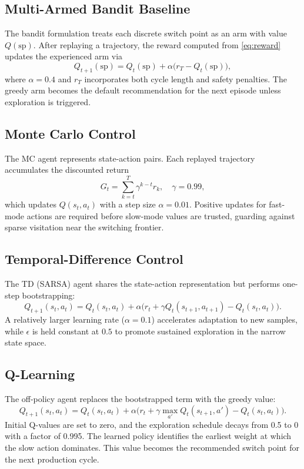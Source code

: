 \documentclass[journal]{IEEEtranTIE}
\begin{document}
\subsection{Multi-Armed Bandit Baseline}
The bandit formulation treats each discrete switch point as an arm with value $Q(\text{sp})$. After replaying a trajectory, the reward computed from \eqref{eq:reward} updates the experienced arm via
\begin{equation}
  Q_{t+1}(\text{sp}) = Q_t(\text{sp}) + \alpha \bigl( r_T - Q_t(\text{sp}) \bigr),
\end{equation}
where $\alpha = 0.4$ and $r_T$ incorporates both cycle length and safety penalties. The greedy arm becomes the default recommendation for the next episode unless exploration is triggered.

\subsection{Monte Carlo Control}
The MC agent represents state-action pairs. Each replayed trajectory accumulates the discounted return
\begin{equation}
  G_t = \sum_{k=t}^{T} \gamma^{k-t} r_k, \quad \gamma = 0.99,
\end{equation}
which updates $Q(s_t, a_t)$ with a step size $\alpha = 0.01$. Positive updates for fast-mode actions are required before slow-mode values are trusted, guarding against sparse visitation near the switching frontier.

\subsection{Temporal-Difference Control}
The TD (SARSA) agent shares the state-action representation but performs one-step bootstrapping:
\begin{equation}
  Q_{t+1}(s_t, a_t) = Q_t(s_t, a_t) + \alpha \bigl( r_t + \gamma Q_t(s_{t+1}, a_{t+1}) - Q_t(s_t, a_t) \bigr).
\end{equation}
A relatively larger learning rate ($\alpha = 0.1$) accelerates adaptation to new samples, while $\epsilon$ is held constant at $0.5$ to promote sustained exploration in the narrow state space.

\subsection{Q-Learning}
The off-policy agent replaces the bootstrapped term with the greedy value:
\begin{equation}
  Q_{t+1}(s_t, a_t) = Q_t(s_t, a_t) + \alpha \bigl(r_t + \gamma \max_{a'} Q_t(s_{t+1}, a') - Q_t(s_t, a_t) \bigr).
\end{equation}
Initial Q-values are set to zero, and the exploration schedule decays from 0.5 to 0 with a factor of 0.995. The learned policy identifies the earliest weight at which the slow action dominates. This value becomes the recommended switch point for the next production cycle.
\end{document}
